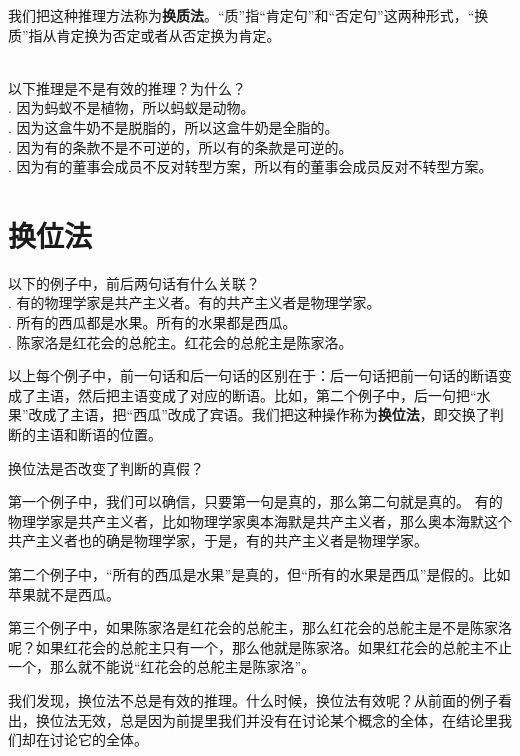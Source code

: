\documentclass[12pt,UTF8]{ctexbook}
\begin{document}
我们把这种推理方法称为\textbf{换质法}。“质”指“肯定句”和“否定句”这两种形式，“换质”指从肯定换为否定或者从否定换为肯定。
\begin{xt}\label{xt:2b-0-0}
    \mbox{} \\
    以下推理是不是有效的推理？为什么？\\
    . 因为蚂蚁不是植物，所以蚂蚁是动物。 \\
    . 因为这盒牛奶不是脱脂的，所以这盒牛奶是全脂的。 \\
    . 因为有的条款不是不可逆的，所以有的条款是可逆的。 \\
    . 因为有的董事会成员不反对转型方案，所以有的董事会成员反对不转型方案。
\end{xt}

\section{换位法}
\begin{et}\label{et:2b-1-0} 
    以下的例子中，前后两句话有什么关联？\\
    . 有的物理学家是共产主义者。有的共产主义者是物理学家。\\
    . 所有的西瓜都是水果。所有的水果都是西瓜。\\
    . 陈家洛是红花会的总舵主。红花会的总舵主是陈家洛。
\end{et}
以上每个例子中，前一句话和后一句话的区别在于：后一句话把前一句话的断语变成了主语，然后把主语变成了对应的断语。比如，第二个例子中，后一句把“水果”改成了主语，把“西瓜”改成了宾语。我们把这种操作称为\textbf{换位法}，即交换了判断的主语和断语的位置。

换位法是否改变了判断的真假？

第一个例子中，我们可以确信，只要第一句是真的，那么第二句就是真的。
有的物理学家是共产主义者，比如物理学家奥本海默是共产主义者，那么奥本海默这个共产主义者也的确是物理学家，于是，有的共产主义者是物理学家。

第二个例子中，“所有的西瓜是水果”是真的，但“所有的水果是西瓜”是假的。比如苹果就不是西瓜。

第三个例子中，如果陈家洛是红花会的总舵主，那么红花会的总舵主是不是陈家洛呢？如果红花会的总舵主只有一个，那么他就是陈家洛。如果红花会的总舵主不止一个，那么就不能说“红花会的总舵主是陈家洛”。

我们发现，换位法不总是有效的推理。什么时候，换位法有效呢？从前面的例子看出，换位法无效，总是因为前提里我们并没有在讨论某个概念的全体，在结论里我们却在讨论它的全体。
\end{document}

